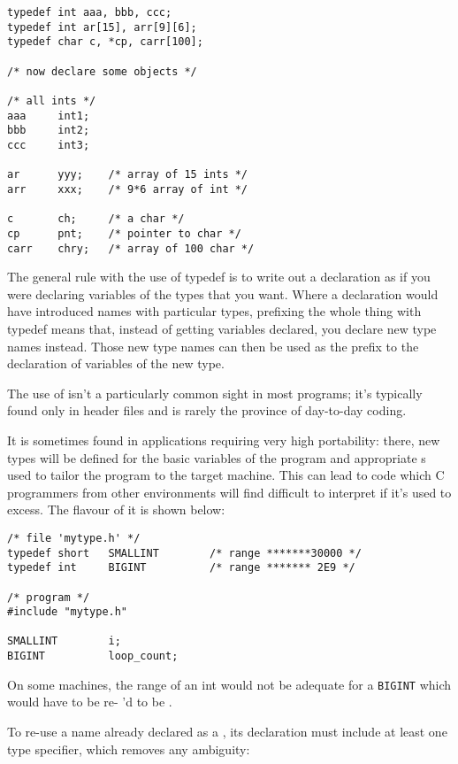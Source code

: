 \begin{Verbatim}
typedef int aaa, bbb, ccc;
typedef int ar[15], arr[9][6];
typedef char c, *cp, carr[100];

/* now declare some objects */

/* all ints */
aaa     int1;
bbb     int2;
ccc     int3;

ar      yyy;    /* array of 15 ints */
arr     xxx;    /* 9*6 array of int */

c       ch;     /* a char */
cp      pnt;    /* pointer to char */
carr    chry;   /* array of 100 char */
\end{Verbatim}

  The general rule with the use of typedef is to write out a declaration
   as if you were declaring variables of the types that you want. Where
   a declaration would have introduced names with particular types,
   prefixing the whole thing with typedef means that, instead of getting
   variables declared, you declare new type names instead. Those new type
   names can then be used as the prefix to the declaration of variables of
   the new type.


  The use of \typedef{} isn't a particularly common sight in
   most programs; it's typically found only in header files and is rarely
   the province of day-to-day coding.


  It is sometimes found in applications requiring very high portability:
   there, new types will be defined for the basic variables of the program
   and appropriate \typedef{}s used to tailor the program to the
   target machine. This can lead to code which C programmers from other
   environments will find difficult to interpret if it's used to excess. The
   flavour of it is shown below:


\begin{Verbatim}
/* file 'mytype.h' */
typedef short   SMALLINT        /* range *******30000 */
typedef int     BIGINT          /* range ******* 2E9 */

/* program */
#include "mytype.h"

SMALLINT        i;
BIGINT          loop_count;
\end{Verbatim}

  On some machines, the range of an int would not be adequate for
   a \texttt{BIGINT} which would have to be re- \typedef{}'d
   to be \klong.


  To re-use a name already declared as a \typedef, its
   declaration must include at least one type specifier, which removes any
   ambiguity:


